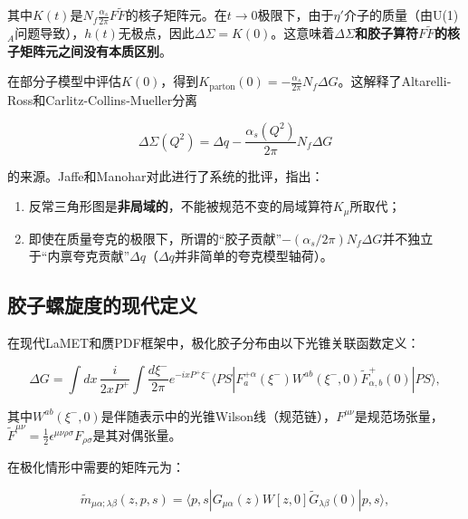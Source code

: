 \documentclass[12pt,a4paper]{ctexart}
\theoremstyle{definition}
\begin{document}
其中$K(t)$是$N_f\frac{\alpha_s}{2\pi}F\tilde{F}$的核子矩阵元。在$t \to 0$极限下，由于$\eta'$介子的质量（由U(1)$_A$问题导致），$h(t)$无极点，因此$\Delta\Sigma = K(0)$。这意味着\textbf{$\Delta\Sigma$和胶子算符$F\tilde{F}$的核子矩阵元之间没有本质区别}\cite{JaffeManohar1990}。

在部分子模型中评估$K(0)$，得到$K_{\text{parton}}(0) = -\frac{\alpha_s}{2\pi}N_f\Delta G$。这解释了Altarelli-Ross\cite{AltarelliRoss}和Carlitz-Collins-Mueller\cite{CarlitzCollinsMueller}分离

\begin{equation}
\Delta\Sigma(Q^2) = \Delta q - \frac{\alpha_s(Q^2)}{2\pi} N_f \Delta G
\label{eq:AR_separation}
\end{equation}

的来源。Jaffe和Manohar\cite{JaffeManohar1990}对此进行了系统的批评，指出：
\begin{enumerate}
    \item 反常三角形图是\textbf{非局域的}，不能被规范不变的局域算符$K_\mu$所取代；
    \item 即使在质量夸克的极限下，所谓的``胶子贡献''$-(\alpha_s/2\pi)N_f\Delta G$并不独立于``内禀夸克贡献''$\Delta q$（$\Delta q$并非简单的夸克模型轴荷）。
\end{enumerate}

\subsection{胶子螺旋度的现代定义}

在现代LaMET和赝PDF框架中，极化胶子分布由以下光锥关联函数定义\cite{Egerer2022,Balitsky2020}：

\begin{equation}
\Delta G = \int dx\, \frac{i}{2xP^+} \int \frac{d\xi^-}{2\pi} e^{-ixP^+\xi^-} \langle PS| F^{+\alpha}_a(\xi^-) W^{ab}(\xi^-, 0) \tilde{F}^+_{\alpha,b}(0) |PS\rangle,
\label{eq:DeltaG_modern}
\end{equation}

其中$W^{ab}(\xi^-, 0)$是伴随表示中的光锥Wilson线（规范链），$F^{\mu\nu}$是规范场张量，$\tilde{F}^{\mu\nu} = \frac{1}{2}\epsilon^{\mu\nu\rho\sigma}F_{\rho\sigma}$是其对偶张量。

在极化情形中需要的矩阵元为\cite{Egerer2022,NoteGluonPDFs}：

\begin{equation}
\tilde{m}_{\mu\alpha;\lambda\beta}(z, p, s) = \langle p, s| G_{\mu\alpha}(z) W[z, 0] \tilde{G}_{\lambda\beta}(0) |p, s\rangle,
\label{eq:helicity_ME}
\end{equation}
\end{document}
